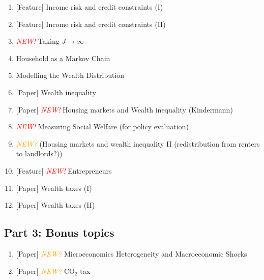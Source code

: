 \documentclass[a4paper,12pt]{article}
\newcommand{\red}{\textcolor{red}}
\newcommand{\orange}{\textcolor{orange}}
\newcommand{\new}{\red{\emph{NEW!}} }
\newcommand{\maybe}{\orange{\emph{NEW?}} }
\begin{document}
\begin{enumerate}
  \item {}[Feature] Income risk and credit constraints (I)
  \item {}[Feature] Income risk and credit constraints (II)
  \item \new Taking $J \to \infty$
  \item Household as a Markov Chain
  \item Modelling the Wealth Distribution
  \item {}[Paper] Wealth inequality \citep{hubmer2021sources}
  \item {}[Paper] \new Housing markets and Wealth inequality (Kindermann)
  \item \new Measuring Social Welfare (for policy evaluation)
  \item \maybe (Housing markets and wealth inequality II (redistribution from renters to landlords?))
  \item {}[Feature] \new Entrepreneurs
  \item {}[Paper] Wealth taxes (I) \citep{guvenen2023use}
  \item {}[Paper] Wealth taxes (II) \citep{boar2023income-or-wealth}
\end{enumerate}

\subsection{Part 3: Bonus topics}

\begin{enumerate}
  \item {} [Paper] \maybe Microeconomics Heterogeneity and Macroeconomic Shocks \citep{kaplan2018microeconomic}
  \item {} [Paper] \maybe CO$_2$ tax
\end{enumerate}







\end{document}

